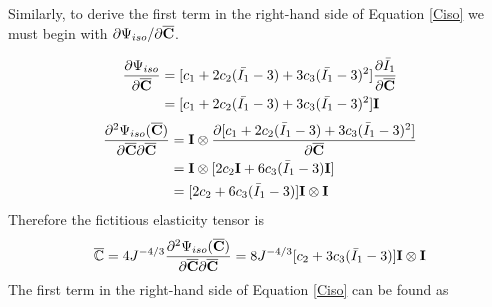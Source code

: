Similarly, to derive the first term in the right-hand side of Equation \ref{Ciso} we must begin with $\partial{\Psi_{iso}}/\partial{\overline{\bold{C}}}$.

\begin{equation}
\begin{split}
\frac{\partial{\Psi_{iso}}}{\partial{\overline{\bold{C}}}} 
&= [c_1 + 2c_2(\bar{I_1} - 3) + 3c_3(\bar{I_1} - 3)^2] \frac{\partial{\bar{I}_1}}{\partial{\overline{\bold{C}}}} \\
&= [c_1 + 2c_2(\bar{I_1} - 3) + 3c_3(\bar{I_1} - 3)^2] \bold{I} 
\end{split}
\end{equation}
\begin{equation}
\begin{split}
\frac{\partial^2\Psi_{iso}(\overline{\bold{C}})}{\partial\overline{\bold{C}}\partial\overline{\bold{C}}} &= 
\bold{I} \otimes \frac{\partial[c_1 + 2c_2({\bar{I}}_1-3) + 3c_3({\bar{I}}_1-3)^2 ]}{\partial{\overline{\bold{C}}}} \\
&= \bold{I} \otimes [2c_2\bold{I} + 6c_3({\bar{I}}_1-3)\bold{I}]\\
&= [2c_2 + 6c_3({\bar{I}}_1-3)] \bold{I} \otimes \bold{I}
\end{split}
\end{equation}
Therefore the fictitious elasticity tensor is
\begin{equation}
\overline{\mathbb{C}} = 4J^{-4/3}\frac{\partial^2\Psi_{iso}(\overline{\bold{C}})}{\partial{\overline{\bold{C}}}{\partial{\overline{\bold{C}}}}} = 8J^{-4/3}[c_2 + 3c_3({\bar{I}}_1 - 3) ]\bold{I} \otimes \bold{I}
\end{equation}
The first term in the right-hand side of Equation \ref{Ciso} can be found as

